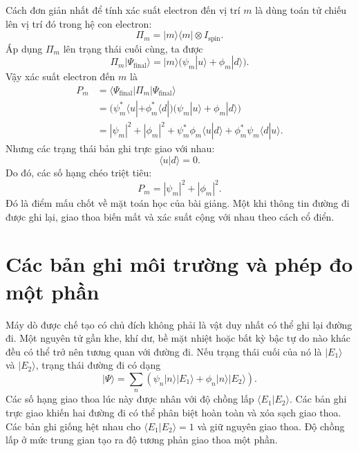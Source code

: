 Cách đơn giản nhất để tính xác suất electron đến vị trí \(m\) là dùng toán tử chiếu lên vị trí đó trong hệ con electron:
\begin{equation}
\Pi_m = |m\rangle\langle m|\otimes I_{\mathrm{spin}}.
\end{equation}
Áp dụng \(\Pi_m\) lên trạng thái cuối cùng, ta được
\begin{equation}
\Pi_m |\Psi_{\mathrm{final}}\rangle
= |m\rangle\bigl(\psi_m|u\rangle+\phi_m|d\rangle\bigr).
\end{equation}
Vậy xác suất electron đến \(m\) là
\begin{align}
P_m
  &= \langle \Psi_{\mathrm{final}}|\Pi_m|\Psi_{\mathrm{final}}\rangle \\
  &= \bigl(\psi_m^*\langle u|+\phi_m^*\langle d|\bigr)
     \bigl(\psi_m|u\rangle+\phi_m|d\rangle\bigr) \\
  &= |\psi_m|^2 + |\phi_m|^2
     + \psi_m^*\phi_m\langle u|d\rangle
     + \phi_m^*\psi_m\langle d|u\rangle.
\end{align}
Nhưng các trạng thái bản ghi trực giao với nhau:
\begin{equation}
\langle u|d\rangle=0.
\end{equation}
Do đó, các số hạng chéo triệt tiêu:
\begin{equation}
P_m = |\psi_m|^2 + |\phi_m|^2.
\end{equation}
Đó là điểm mấu chốt về mặt toán học của bài giảng. Một khi thông tin đường đi được ghi lại, giao thoa biến mất và xác suất cộng với nhau theo cách cổ điển.

\begin{classroomqa}
\end{classroomqa}

\section{Các bản ghi môi trường và phép đo một phần}

Máy dò được chế tạo có chủ đích không phải là vật duy nhất có thể ghi lại đường đi. Một nguyên tử gần khe, khí dư, bề mặt nhiệt hoặc bất kỳ bậc tự do nào khác đều có thể trở nên tương quan với đường đi. Nếu trạng thái cuối của nó là \(|E_1\rangle\) và \(|E_2\rangle\), trạng thái đường đi có dạng
\begin{equation}
|\Psi\rangle
=\sum_n\left(\psi_n|n\rangle|E_1\rangle
+\phi_n|n\rangle|E_2\rangle\right).
\end{equation}
Các số hạng giao thoa lúc này được nhân với độ chồng lấp \(\langle E_1|E_2\rangle\). Các bản ghi trực giao khiến hai đường đi có thể phân biệt hoàn toàn và xóa sạch giao thoa. Các bản ghi giống hệt nhau cho \(\langle E_1|E_2\rangle=1\) và giữ nguyên giao thoa. Độ chồng lấp ở mức trung gian tạo ra độ tương phản giao thoa một phần.

